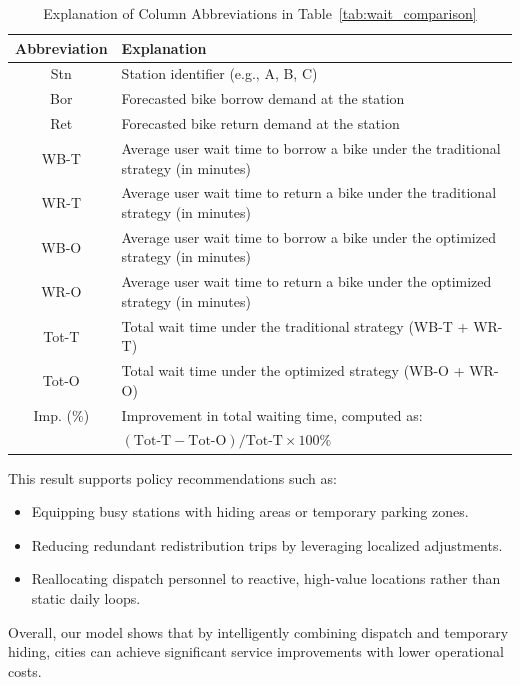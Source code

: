 \documentclass[11pt,a4paper]{article}
\begin{document}
\begin{table}[ht]
    \centering
    \caption{Explanation of Column Abbreviations in Table~\ref{tab:wait_comparison}}
    \label{tab:col_explanation}
    \small
    \begin{tabularx}{\textwidth}{|c|X|}
    \hline
    \textbf{Abbreviation} & \textbf{Explanation} \\
    \hline
    Stn & Station identifier (e.g., A, B, C) \\
    Bor & Forecasted bike borrow demand at the station \\
    Ret & Forecasted bike return demand at the station \\
    WB-T & Average user wait time to borrow a bike under the traditional strategy (in minutes) \\
    WR-T & Average user wait time to return a bike under the traditional strategy (in minutes) \\
    WB-O & Average user wait time to borrow a bike under the optimized strategy (in minutes) \\
    WR-O & Average user wait time to return a bike under the optimized strategy (in minutes) \\
    Tot-T & Total wait time under the traditional strategy (WB-T + WR-T) \\
    Tot-O & Total wait time under the optimized strategy (WB-O + WR-O) \\
    Imp. (\%) & Improvement in total waiting time, computed as: \\
    & $\left( \text{Tot-T} - \text{Tot-O} \right) / \text{Tot-T} \times 100\%$ \\
    \hline
    \end{tabularx}
\end{table}   

This result supports policy recommendations such as:
\begin{itemize}
    \item Equipping busy stations with hiding areas or temporary parking zones.
    \item Reducing redundant redistribution trips by leveraging localized adjustments.
    \item Reallocating dispatch personnel to reactive, high-value locations rather than static daily loops.
\end{itemize}

Overall, our model shows that by intelligently combining dispatch and temporary hiding, cities can achieve significant service improvements with lower operational costs.
\end{document}
